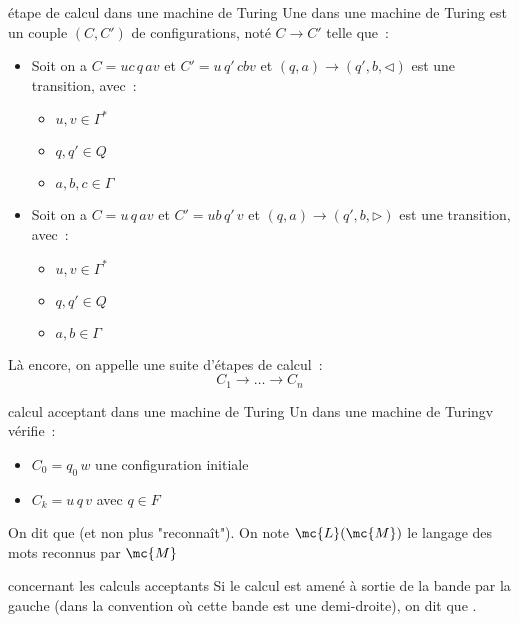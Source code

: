 \begin{definition}{}{étape de calcul dans une machine de Turing}
    Une  dans une machine de Turing est un couple $(C,C')$ de configurations, noté $C \rightarrow C'$ telle que~:
    \begin{itemize}
        \item Soit on a $C = uc\,q\,av$ et $C' = u\, q'\, cbv$  et $(q,a) \rightarrow (q',b,\triangleleft)$ est une transition, avec~:
        \begin{itemize}
            \item $u,v \in \Gamma^*$
            \item $q,q' \in Q$ 
            \item $a,b,c \in \Gamma$
        \end{itemize}
        \item Soit on a $C = u\,q\,av$ et $C' = ub\, q'\, v$  et $(q,a) \rightarrow (q',b,\triangleright)$ est une transition, avec~:
        \begin{itemize}
            \item $u,v \in \Gamma^*$
            \item $q,q' \in Q$ 
            \item $a,b \in \Gamma$
        \end{itemize}
    \end{itemize}
    Là encore, on appelle  une suite d'étapes de calcul~:
    $$C_1 \to \dots \to C_n$$
\end{definition}

\begin{definition}{}{calcul acceptant dans une machine de Turing}
    Un  dans une machine de Turingv vérifie~:
    \begin{itemize}
        \item $C_0 = q_0\,w$ une configuration initiale
        \item $C_k = u\,q\,v$ avec $q \in F$
    \end{itemize}
    On dit que  (et non plus "reconnaît").
    On note $\mc{L}(\mc{M})$ le langage des mots reconnus par $\mc{M}$
\end{definition}

\begin{remarque}{}{concernant les calculs acceptants}
    Si le calcul est amené à sortie de la bande par la gauche (dans la convention où cette bande est une demi-droite), on dit que .
\end{remarque}

